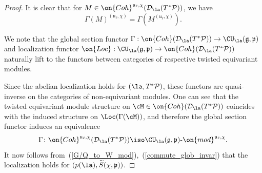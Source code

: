 \documentclass[12pt]{amsart}
\begin{document}
\begin{proof}
 




   It is clear  that for $M \in \on{Coh}^{\mathfrak{u}_\ell,\chi}(\mathcal{D}_{\la}(T^*\mathcal{P}))$, we have
    \begin{equation}\label{commute_glob_invar}
    \Gamma(M)^{(\mathfrak{u}_\ell,\chi)}=\Gamma(M^{(\mathfrak{u}_\ell,\chi)}).   
    \end{equation} 
    
    We note that the global section functor $\Gamma: \on{Coh}(\mathcal{D}_{\la}(T^*\mathcal{P})) \to  \CU_{\la}(\mathfrak{g},\mathfrak{p})$ and localization functor $\on{Loc}: \CU_{\la}(\mathfrak{g},\mathfrak{p})\to \on{Coh}(\mathcal{D}_{\la}(T^*\mathcal{P}))$ naturally lift to the functors between categories of respective twisted equivariant modules. 
    
    Since the abelian localization holds for $(\la,T^*\mathcal{P})$, these functors are quasi-inverse on the categories of non-equivariant modules. One can see that the twisted equivariant module structure on $\cM\in \on{Coh}(\mathcal{D}_{\la}(T^*\mathcal{P}))$ coincides with the induced structure on $\Loc(\Gamma(\cM))$, and therefore the global section functor induces an equivalence 
    \begin{equation*}
    \Gamma\colon \on{Coh}^{\mathfrak{u}_\ell,\chi}(\mathcal{D}_{\la}(T^*\mathcal{P})) \iso  \CU_{\la}(\mathfrak{g},\mathfrak{p})\text{-}\on{mod}^{\mathfrak{u}_\ell,\chi}.    
    \end{equation*}
    It now follows from~(\ref{G/Q_to_W_mod}),~(\ref{commute_glob_invar}) that the localization holds for $(p(\la),\widetilde{S}(\chi,\mathfrak{p}))$.
\end{proof}
    
\end{document}

